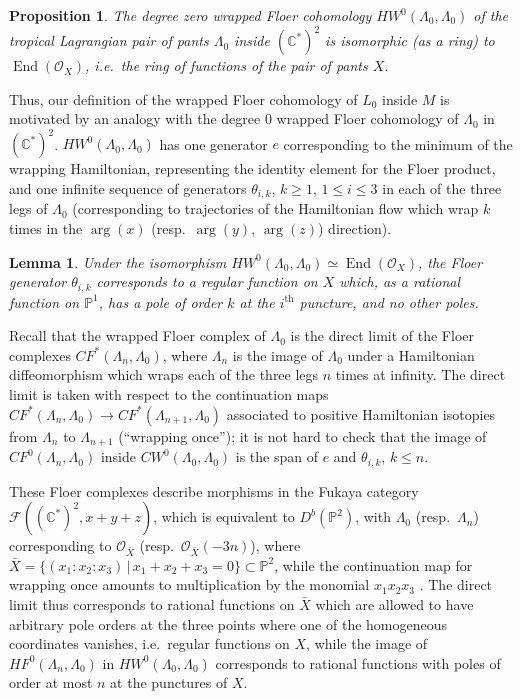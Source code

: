 \documentclass[11pt,leqno]{amsart}
\newtheorem{lemma}[theo]{Lemma}
\newtheorem{prop}[theo]{Proposition}
\numberwithin{equation}{section}
\def\C{\mathbb{C}}
\def\F{{\mathcal F}}
\def\O{{\mathcal O}}
\def\PP{{\mathbb P}}
\def\End{\operatorname{End}}
\begin{document}
\begin{prop}
The degree zero wrapped Floer cohomology $HW^0(\Lambda_0,\Lambda_0)$ of
the tropical Lagrangian pair of pants $\Lambda_0$ inside $(\C^*)^2$ is
isomorphic (as a ring) to $\End(\O_X)$, i.e.\ the ring of functions of the pair of pants $X$.
\end{prop}

Thus, our definition of the wrapped Floer cohomology of $L_0$ inside $M$
is motivated by an analogy with the degree 0 wrapped Floer cohomology
of $\Lambda_0$ in $(\C^*)^2$. 
$HW^0(\Lambda_0,\Lambda_0)$ has one generator $e$ corresponding 
to the minimum of the wrapping Hamiltonian, representing the
identity element for the Floer product, and one infinite sequence 
of generators $\theta_{i,k}$, $k\geq 1$, $1\leq i\leq 3$ in each of the three legs of 
$\Lambda_0$ (corresponding to trajectories of the Hamiltonian flow which
wrap $k$ times in the $\arg(x)$ (resp.\ $\arg(y)$, $\arg(z)$) direction).

\begin{lemma} \label{l:floergens_as_rationalfunctions}
Under the isomorphism $HW^0(\Lambda_0,\Lambda_0)\simeq \End(\O_X)$, 
the Floer generator $\theta_{i,k}$ corresponds to a regular function on $X$ which,
as a rational function on $\PP^1$, has a pole of order $k$ at the
$i^\text{th}$ puncture, and no other poles.
\end{lemma}

\proof Recall that the wrapped Floer
complex of $\Lambda_0$ is the direct limit of the Floer complexes
$CF^*(\Lambda_{n},\Lambda_0)$, where $\Lambda_{n}$ is the image of
$\Lambda_0$ under a Hamiltonian diffeomorphism which wraps each of the
three legs $n$ times at infinity.
The direct limit is taken with respect to the continuation maps 
$CF^*(\Lambda_n,\Lambda_0)\to CF^*(\Lambda_{n+1},\Lambda_0)$ associated
to positive Hamiltonian isotopies from $\Lambda_n$ to $\Lambda_{n+1}$
(``wrapping once''); it is not hard to check that the image of
$CF^0(\Lambda_n,\Lambda_0)$ inside $CW^0(\Lambda_0,\Lambda_0)$ is the span
of $e$ and $\theta_{i,k}$, $k\leq n$.

These Floer complexes describe morphisms in the Fukaya category 
$\F((\C^*)^2,x+y+z)$, which is equivalent to $D^b(\PP^2)$, with $\Lambda_0$
(resp.\ $\Lambda_n$) 
corresponding to $\O_{\bar{X}}$ (resp.\ $\O_{\bar{X}}(-3n)$), where
$\bar{X}=\{(x_1\!:\!x_2\!:\!x_3)\,|\,x_1+x_2+x_3=0\}\subset \PP^2$,
while the continuation map for wrapping once amounts to multiplication by the monomial
$x_1x_2x_3$ \cite{Hanlon}. The direct limit thus corresponds to rational
functions on $\bar{X}$ which are allowed to have arbitrary pole orders at
the three points where one of the homogeneous coordinates vanishes, i.e.\
regular functions on $X$, while the image of $HF^0(\Lambda_n,\Lambda_0)$ in
$HW^0(\Lambda_0,\Lambda_0)$ corresponds to rational functions with poles
of order at most $n$ at the punctures of $X$.  
\end{document}
